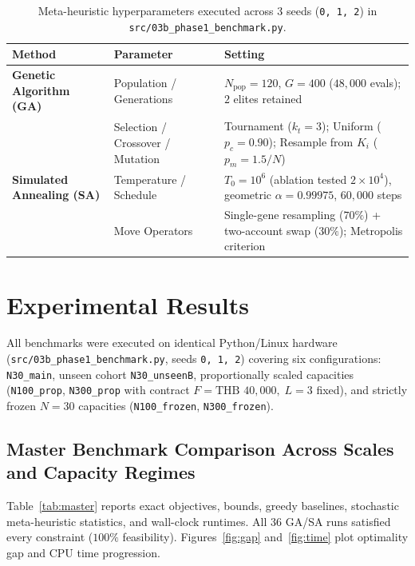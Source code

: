 \documentclass[10pt,a4paper]{article}
\begin{document}
\begin{table}[!ht]
\centering
\caption{Meta-heuristic hyperparameters executed across 3 seeds (\texttt{0, 1, 2}) in \texttt{src/03b\_phase1\_benchmark.py}.}
\label{tab:mh_params}
\small
\begin{tabularx}{\textwidth}{llX}
\toprule
\textbf{Method} & \textbf{Parameter} & \textbf{Setting} \\
\midrule
\textbf{Genetic Algorithm (GA)} & Population / Generations & $N_{\text{pop}} = 120$, $G = 400$ ($48{,}000$ evals); $2$ elites retained \\
 & Selection / Crossover / Mutation & Tournament ($k_t=3$); Uniform ($p_c=0.90$); Resample from $K_i$ ($p_m=1.5/N$) \\
\textbf{Simulated Annealing (SA)} & Temperature / Schedule & $T_0 = 10^6$ (ablation tested $2\times 10^4$), geometric $\alpha = 0.99975$, $60{,}000$ steps \\
 & Move Operators & Single-gene resampling ($70\%$) + two-account swap ($30\%$); Metropolis criterion \\
\bottomrule
\end{tabularx}
\end{table}

\section{Experimental Results}

All benchmarks were executed on identical Python/Linux hardware (\texttt{src/03b\_phase1\_benchmark.py}, seeds \texttt{0, 1, 2}) covering six configurations: \texttt{N30\_main}, unseen cohort \texttt{N30\_unseenB}, proportionally scaled capacities (\texttt{N100\_prop}, \texttt{N300\_prop} with contract $F=\text{THB~}40{,}000,\; L=3$ fixed), and strictly frozen $N=30$ capacities (\texttt{N100\_frozen}, \texttt{N300\_frozen}).

\subsection{Master Benchmark Comparison Across Scales and Capacity Regimes}
Table~\ref{tab:master} reports exact objectives, bounds, greedy baselines, stochastic meta-heuristic statistics, and wall-clock runtimes. All $36$ GA/SA runs satisfied every constraint ($100\%$ feasibility). Figures~\ref{fig:gap} and~\ref{fig:time} plot optimality gap and CPU time progression.
\end{document}

